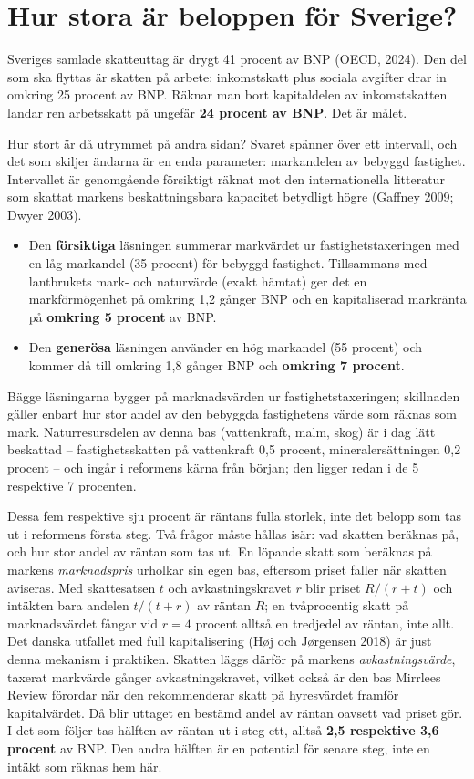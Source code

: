 \documentclass[11pt]{article}
\begin{document}
\section{Hur stora är beloppen för Sverige?}

Sveriges samlade skatteuttag är drygt 41 procent av BNP (OECD, 2024). Den del som ska flyttas är skatten på arbete: inkomstskatt plus sociala avgifter drar in omkring 25 procent av BNP. Räknar man bort kapitaldelen av inkomstskatten landar ren arbetsskatt på ungefär \textbf{24 procent av BNP}. Det är målet.

Hur stort är då utrymmet på andra sidan? Svaret spänner över ett intervall, och det som skiljer ändarna är en enda parameter: markandelen av bebyggd fastighet. Intervallet är genomgående försiktigt räknat mot den internationella litteratur som skattat markens beskattningsbara kapacitet betydligt högre (Gaffney 2009; Dwyer 2003).

\begin{itemize}
\item Den \textbf{försiktiga} läsningen summerar markvärdet ur fastighetstaxeringen med en låg markandel (35 procent) för bebyggd fastighet. Tillsammans med lantbrukets mark- och naturvärde (exakt hämtat) ger det en markförmögenhet på omkring 1,2 gånger BNP och en kapitaliserad markränta på \textbf{omkring 5 procent} av BNP.
\item Den \textbf{generösa} läsningen använder en hög markandel (55 procent) och kommer då till omkring 1,8 gånger BNP och \textbf{omkring 7 procent}.
\end{itemize}

Bägge läsningarna bygger på marknadsvärden ur fastighetstaxeringen; skillnaden gäller enbart hur stor andel av den bebyggda fastighetens värde som räknas som mark. Naturresursdelen av denna bas (vattenkraft, malm, skog) är i dag lätt beskattad -- fastighetsskatten på vattenkraft 0,5 procent, mineralersättningen 0,2 procent -- och ingår i reformens kärna från början; den ligger redan i de 5 respektive 7 procenten.

Dessa fem respektive sju procent är räntans fulla storlek, inte det belopp som tas ut i reformens första steg. Två frågor måste hållas isär: vad skatten beräknas på, och hur stor andel av räntan som tas ut. En löpande skatt som beräknas på markens \emph{marknadspris} urholkar sin egen bas, eftersom priset faller när skatten aviseras. Med skattesatsen $t$ och avkastningskravet $r$ blir priset $R/(r+t)$ och intäkten bara andelen $t/(t+r)$ av räntan $R$; en tvåprocentig skatt på marknadsvärdet fångar vid $r=4$ procent alltså en tredjedel av räntan, inte allt. Det danska utfallet med full kapitalisering (Høj och Jørgensen 2018) är just denna mekanism i praktiken. Skatten läggs därför på markens \emph{avkastningsvärde}, taxerat markvärde gånger avkastningskravet, vilket också är den bas Mirrlees Review förordar när den rekommenderar skatt på hyresvärdet framför kapitalvärdet. Då blir uttaget en bestämd andel av räntan oavsett vad priset gör. I det som följer tas hälften av räntan ut i steg ett, alltså \textbf{2,5 respektive 3,6 procent} av BNP. Den andra hälften är en potential för senare steg, inte en intäkt som räknas hem här.
\end{document}

